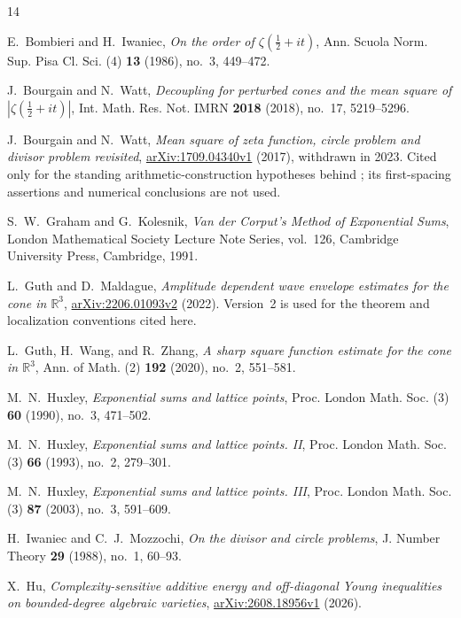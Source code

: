 \documentclass[11pt,reqno]{amsart}
\numberwithin{equation}{section}
\theoremstyle{definition}
\theoremstyle{remark}
\newcommand{\R}{\mathbb R}
\begin{document}
\begin{thebibliography}{14}

E.~Bombieri and H.~Iwaniec,
\emph{On the order of $\zeta(\frac12+it)$},
Ann. Scuola Norm. Sup. Pisa Cl. Sci. (4) \textbf{13} (1986), no.~3, 449--472.

J.~Bourgain and N.~Watt,
\emph{Decoupling for perturbed cones and the mean square of $|\zeta(\frac12+it)|$},
Int. Math. Res. Not. IMRN \textbf{2018} (2018), no.~17, 5219--5296.

J.~Bourgain and N.~Watt,
\emph{Mean square of zeta function, circle problem and divisor problem revisited},
\href{https://arxiv.org/abs/1709.04340v1}{arXiv:1709.04340v1} (2017), withdrawn in 2023.
Cited only for the standing arithmetic-construction hypotheses behind \cite{LY}; its first-spacing assertions and numerical conclusions are not used.

S.~W.~Graham and G.~Kolesnik,
\emph{Van der Corput's Method of Exponential Sums},
London Mathematical Society Lecture Note Series, vol.~126,
Cambridge University Press, Cambridge, 1991.

L.~Guth and D.~Maldague,
\emph{Amplitude dependent wave envelope estimates for the cone in $\R^3$},
\href{https://arxiv.org/abs/2206.01093v2}{arXiv:2206.01093v2} (2022).
Version~2 is used for the theorem and localization conventions cited here.

L.~Guth, H.~Wang, and R.~Zhang,
\emph{A sharp square function estimate for the cone in $\R^3$},
Ann. of Math. (2) \textbf{192} (2020), no.~2, 551--581.

M.~N.~Huxley,
\emph{Exponential sums and lattice points},
Proc. London Math. Soc. (3) \textbf{60} (1990), no.~3, 471--502.

M.~N.~Huxley,
\emph{Exponential sums and lattice points. II},
Proc. London Math. Soc. (3) \textbf{66} (1993), no.~2, 279--301.

M.~N.~Huxley,
\emph{Exponential sums and lattice points. III},
Proc. London Math. Soc. (3) \textbf{87} (2003), no.~3, 591--609.

H.~Iwaniec and C.~J.~Mozzochi,
\emph{On the divisor and circle problems},
J. Number Theory \textbf{29} (1988), no.~1, 60--93.

X.~Hu,
\emph{Complexity-sensitive additive energy and off-diagonal Young inequalities on bounded-degree algebraic varieties},
\href{https://arxiv.org/abs/2608.18956v1}{arXiv:2608.18956v1} (2026).


\end{thebibliography}
\end{document}
